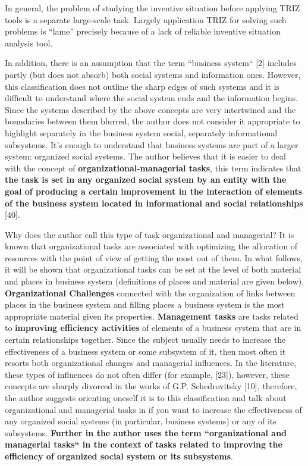 \documentclass[11pt,a4paper]{book}
\begin{document}
In general, the problem of studying the inventive situation before applying
TRIZ tools is a separate large-scale task. Largely application TRIZ for
solving such problems is “lame” precisely because of a lack of reliable
inventive situation analysis tool.

In addition, there is an assumption that the term “business system“ [2]
includes partly (but does not absorb) both social systems and information
ones.  However, this classification does not outline the sharp edges of such
systems and it is difficult to understand where the social system ends and the
information begins. Since the systems described by the above concepts are very
intertwined and the boundaries between them blurred, the author does not
consider it appropriate to highlight separately in the business system social,
separately informational subsystems.  It’s enough to understand that business
systems are part of a larger system: organized social systems.  The author
believes that it is easier to deal with the concept of
\textbf{organizational-managerial tasks}, this term indicates that \textbf{the
  task is set in any organized social system by an entity with the goal of
  producing a certain improvement in the interaction of elements of the
  business system located in informational and social relationships} [40].

Why does the author call this type of task organizational and managerial?  It
is known that organizational tasks are associated with optimizing the
allocation of resources with the point of view of getting the most out of
them.  In what follows, it will be shown that organizational tasks can be set
at the level of both material and places in business system (definitions of
places and material are given below). \textbf{Organizational Challenges}
connected with the organization of links between places in the business system
and filling places a business system is the most appropriate material given
its properties.  \textbf{Management tasks} are tasks related to
\textbf{improving efficiency activities} of elements of a business system that
are in certain relationships together. Since the subject usually needs to
increase the effectiveness of a business system or some subsystem of it, then
most often it resorts both organizational changes and managerial influences.
In the literature, these types of influences do not often differ (for example,
[23]), however, these concepts are sharply divorced in the works of
G.P. Schedrovitsky [10], therefore, the author suggests orienting oneself it
is to this classification and talk about organizational and managerial tasks
in if you want to increase the effectiveness of any organized social systems
(in particular, business systems) or any of its subsystems. \textbf{Further in
  the author uses the term “organizational and managerial tasks“ in the
  context of tasks related to improving the efficiency of organized social
  system or its subsystems}.
\end{document}
